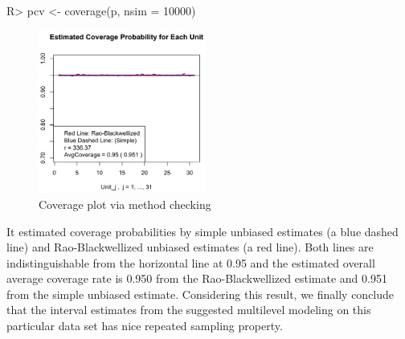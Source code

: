 \documentclass[article]{jss}
\begin{document}
\begin{CodeChunk}
\begin{CodeInput}
R> pcv <- coverage(p, nsim = 10000)
\end{CodeInput}
\end{CodeChunk}
\begin{figure}[h]
\begin{center}
\includegraphics[width = 5.5cm]{hospital2.png}
\caption{Coverage plot via method checking}
\end{center}
\end{figure}

It estimated coverage probabilities by simple unbiased estimates (a blue dashed line) and Rao-Blackwellized unbiased estimates (a red line). Both lines are indistinguishable from the horizontal line at 0.95 and the estimated overall average coverage rate is 0.950 from the Rao-Blackwellized estimate and 0.951 from the simple unbiased estimate. Considering this result, we finally conclude that the interval estimates from the suggested multilevel modeling on this particular data set has nice repeated sampling property.



\end{document}
